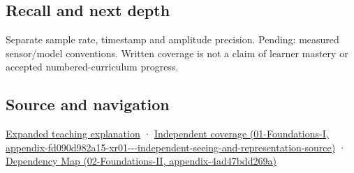 \subsection{Recall and next depth}\label{appendix-1077ea8fc737-recall-and-next-depth}

Separate sample rate, timestamp and amplitude precision. Pending: measured sensor/model conventions. Written coverage is not a claim of learner mastery or accepted numbered-curriculum progress.

\subsection{Source and navigation}\label{appendix-1077ea8fc737-source-and-navigation}

\href{Continuous\%20Notes/University\%20-\%20Worlds,\%20Images\%20and\%20Inference\%20-\%20Graphics,\%20Vision\%20and\%20Photography\#Sampling\%20is\%20a\%20question\%20of\%20what\%20remains\%20distinguishable}{Expanded teaching explanation} · \href{../01-Foundations-I/main.pdf\#nameddest=appendix-fd090d982a15-xr01---independent-seeing-and-representation-source}{Independent coverage (01-Foundations-I, appendix-fd090d982a15-xr01-\/-\/-independent-seeing-and-representation-source)} · \href{../02-Foundations-II/main.pdf\#nameddest=appendix-4ad47bdd269a}{Dependency Map (02-Foundations-II, appendix-4ad47bdd269a)}
